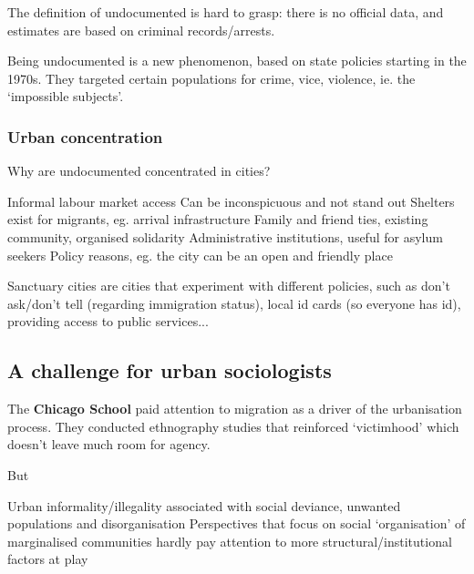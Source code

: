 \documentclass{article}
\begin{document}
The definition of undocumented is hard to grasp: there is no official data, and estimates are based on criminal records/arrests.


Being undocumented is a new phenomenon, based on state policies starting in the 1970s. They targeted certain populations for crime, vice, violence, ie. the `impossible subjects'.

\subsubsection{Urban concentration}

Why are undocumented concentrated in cities?

\begin{outline}
	\1 Informal labour market access
	\1 Can be inconspicuous and not stand out
	\1 Shelters exist for migrants, eg. arrival infrastructure
	\1 Family and friend ties, existing community, organised solidarity
	\1 Administrative institutions, useful for asylum seekers
	\1 Policy reasons, eg. the city can be an open and friendly place
\end{outline}

Sanctuary cities are cities that experiment with different policies, such as don't ask/don't tell (regarding immigration status), local id cards (so everyone has id), providing access to public services...


\subsection{A challenge for urban sociologists}

The \textbf{Chicago School} paid attention to migration as a driver of the urbanisation process. They conducted ethnography studies that reinforced `victimhood' which doesn't leave much room for agency. 

But

\begin{outline}
	\1 Urban informality/illegality associated with social deviance, unwanted populations and disorganisation
	\1 Perspectives that focus on social `organisation' of marginalised communities hardly pay attention to more structural/institutional factors at play
\end{outline}
\end{document}
